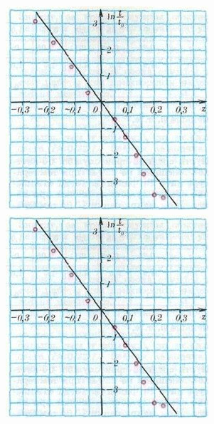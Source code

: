 \documentclass[12pt, a4pape]{article}
\begin{document}
    \begin{figure}[ht]
        \centering
        \begin{minipage}[t]{0.45\textwidth}
            \centering
            \includegraphics[width=\linewidth]{images/pict2.jpg}
            \caption{}
        \end{minipage}
        \hfill
        \begin{minipage}[t]{0.45\textwidth}
            \centering
            \includegraphics[width=\linewidth]{images/pict2.jpg}
            \caption{}
        \end{minipage}
    \end{figure}
\end{document}
